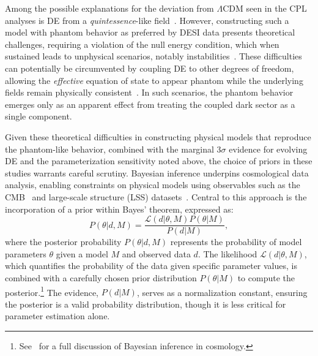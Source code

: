 \documentclass[floats,floatfix,showpacs,amssymb,prd,twocolumn,superscriptaddress,nofootinbib,reprint,preprintnumbers]{revtex4-2}
\begin{document}
Among the possible explanations for the deviation from $\Lambda$CDM seen in the CPL analyses is DE from a \textit{quintessence}-like field~\cite{Peebles:1987ek,Ratra:1987rm}. However, constructing such a model with phantom behavior as preferred by DESI data presents theoretical challenges, requiring a violation of the null energy condition, which when sustained leads to unphysical scenarios, notably instabilities~\cite{Caldwell:1999ew,Hu:2004kh}. These difficulties can potentially be circumvented by coupling DE to other degrees of freedom, allowing the \textit{effective} equation of state to appear phantom while the underlying fields remain physically consistent~\cite{Das:2005yj,Carroll:2004hc,Khoury:2025txd,Huey:2004qv,Brax:2023qyp,Smith:2024ibv,Chen:2025ywv}. In such scenarios, the phantom behavior emerges only as an apparent effect from treating the coupled dark sector as a single component.

Given these theoretical difficulties in constructing physical models that reproduce the phantom-like behavior, combined with the marginal $3\sigma$ evidence for evolving DE and the parameterization sensitivity noted above, the choice of priors in these studies warrants careful scrutiny. Bayesian inference underpins cosmological data analysis, enabling constraints on physical models using observables such as the CMB~\cite{Planck:2018vyg} and large-scale structure (LSS) datasets~\cite{Troster:2019ean,Ivanov:2019hqk,DESI:2024mwx,Ivanov:2024jtl}. Central to this approach is the incorporation of a prior within Bayes' theorem, expressed as:
\begin{equation}
P(\theta | d, M) = \frac{\mathcal{L}(d | \theta, M) P(\theta|M)}{P(d | M)},
\end{equation}
where the posterior probability $P(\theta | d, M)$ represents the probability of model parameters $\theta$ given a model $M$ and observed data $d$. The likelihood $\mathcal{L}(d | \theta, M)$, which quantifies the probability of the data given specific parameter values, is combined with a carefully chosen prior distribution $P(\theta | M)$ to compute the posterior.\footnote{See~\cite{Trotta:2017wnx} for a full discussion of Bayesian inference in cosmology.} The evidence, $P(d | M)$, serves as a normalization constant, ensuring the posterior is a valid probability distribution, though it is less critical for parameter estimation alone.
\end{document}

